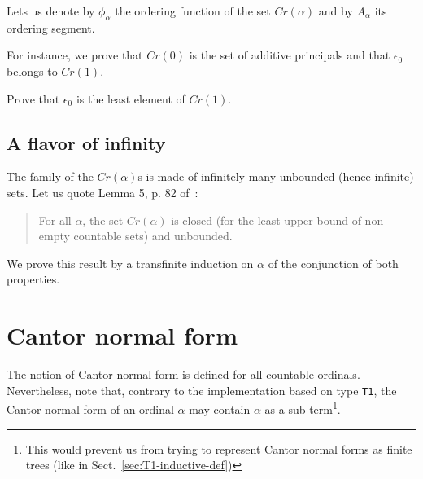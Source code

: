 

Lets us denote by $\phi_\alpha$ the ordering function of the set $\textit{Cr}(\alpha)$ and by $A_\alpha$ its ordering segment.



\label{sect:phi-schutte}



For instance,  we prove that $\textit{Cr}(0)$ is the set of additive principals and that $\epsilon_0$
belongs to $\textit{Cr}(1)$.





\begin{exercise}
 Prove that $\epsilon_0$ is the least element of $\textit{Cr}(1)$.
\end{exercise}


\subsection{A flavor of infinity}



The family of the $\textit{Cr}(\alpha)$s is made of infinitely many unbounded (hence infinite) sets.
Let us quote Lemma 5, p. 82  of~\cite{schutte}:
\begin{quote}
  For all $\alpha$, the set $\textit{Cr}(\alpha)$ is closed (for the least upper bound of non-empty countable sets) and unbounded.
\end{quote}

We prove this result by a transfinite induction on $\alpha$ of the conjunction of  both properties.









\section{Cantor normal form}

The notion of Cantor normal form is defined for all countable ordinals.
Nevertheless, note that, contrary to the implementation based on type \texttt{T1},
the Cantor normal form of an ordinal $\alpha$ may contain $\alpha$ as a 
sub-term\footnote{This would prevent us from trying to represent Cantor normal forms as finite trees (like in Sect.~\ref{sec:T1-inductive-def})}.

